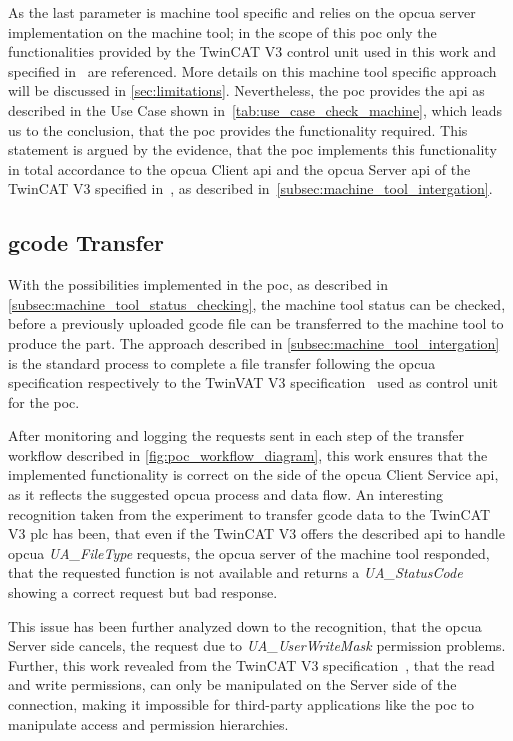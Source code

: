 \documentclass[
a4paper,
twoside,
headsepline,
cleardoublepage=empty,
parskip=half,
draft=false
]{scrbook}
\begin{document}
				As the last parameter is machine tool specific and relies on the \gls{opcua} server implementation on the machine tool; in the scope of this \gls{poc} only the functionalities provided by the TwinCAT V3 control unit used in this work and specified in~\cite{twincat2018} are referenced. More details on this machine tool specific approach will be discussed in \cref{sec:limitations}. Nevertheless, the \gls{poc} provides the \gls{api} as described in the Use Case shown in~\cref{tab:use_case_check_machine}, which leads us to the conclusion, that the \gls{poc} provides the functionality required. This statement is argued by the evidence, that the \gls{poc} implements this functionality in total accordance to the \gls{opcua} Client \gls{api} and the \gls{opcua} Server \gls{api} of the TwinCAT V3 specified in~\cite{twincat2018}, as described in~\cref{subsec:machine_tool_intergation}.

			\subsection{\gls{gcode} Transfer}\label{subsec:g_code_transfer}

				With the possibilities implemented in the \gls{poc}, as described in \cref{subsec:machine_tool_status_checking}, the machine tool status can be checked, before a previously uploaded \gls{gcode} file can be transferred to the machine tool to produce the part. The approach described in \cref{subsec:machine_tool_intergation} is the standard process to complete a file transfer following the \gls{opcua} specification respectively to the TwinVAT V3 specification~\cite{twincat2018} used as control unit for the \gls{poc}.

				After monitoring and logging the requests sent in each step of the transfer workflow described in \cref{fig:poc_workflow_diagram}, this work ensures that the implemented functionality is correct on the side of the \gls{opcua} Client Service \gls{api}, as it reflects the suggested \gls{opcua} process and data flow. An interesting recognition taken from the experiment to transfer \gls{gcode} data to the TwinCAT V3 \gls{plc} has been, that even if the TwinCAT V3 offers the described \gls{api} to handle \gls{opcua} \textit{UA\_FileType} requests, the \gls{opcua} server of the machine tool responded, that the requested function is not available and returns a \textit{UA\_StatusCode} showing a correct request but bad response.
				
				This issue has been further analyzed down to the recognition, that the \gls{opcua} Server side cancels, the request due to \textit{UA\_UserWriteMask} permission problems. Further, this work revealed from the TwinCAT V3 specification~\cite{twincat2018}, that the read and write permissions, can only be manipulated on the Server side of the connection, making it impossible for third-party applications like the \gls{poc} to manipulate access and permission hierarchies. 
				
\end{document}
